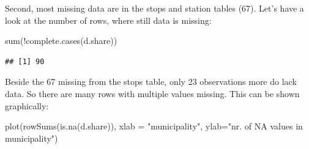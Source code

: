 \documentclass[
]{article}
\newenvironment{Shaded}{\begin{snugshade}}{\end{snugshade}}
\newcommand{\AttributeTok}[1]{\textcolor[rgb]{0.77,0.63,0.00}{#1}}
\newcommand{\CommentTok}[1]{\textcolor[rgb]{0.56,0.35,0.01}{\textit{#1}}}
\newcommand{\ConstantTok}[1]{\textcolor[rgb]{0.00,0.00,0.00}{#1}}
\newcommand{\FunctionTok}[1]{\textcolor[rgb]{0.00,0.00,0.00}{#1}}
\newcommand{\NormalTok}[1]{#1}
\newcommand{\OtherTok}[1]{\textcolor[rgb]{0.56,0.35,0.01}{#1}}
\newcommand{\SpecialCharTok}[1]{\textcolor[rgb]{0.00,0.00,0.00}{#1}}
\newcommand{\StringTok}[1]{\textcolor[rgb]{0.31,0.60,0.02}{#1}}
\begin{document}
\begin{Shaded}
\end{Shaded}

Second, most missing data are in the stops and station tables (67).
Let's have a look at the number of rows, where still data is missing:

\begin{Shaded}
\begin{Highlighting}[]
\FunctionTok{sum}\NormalTok{(}\SpecialCharTok{!}\FunctionTok{complete.cases}\NormalTok{(d.share))}
\end{Highlighting}
\end{Shaded}

\begin{verbatim}
## [1] 90
\end{verbatim}

Beside the 67 missing from the stops table, only 23 observations more do
lack data. So there are many rows with multiple values missing. This can
be shown graphically:

\begin{Shaded}
\begin{Highlighting}[]
\FunctionTok{plot}\NormalTok{(}\FunctionTok{rowSums}\NormalTok{(}\FunctionTok{is.na}\NormalTok{(d.share)), }\AttributeTok{xlab =} \StringTok{"municipality"}\NormalTok{, }\AttributeTok{ylab=}\StringTok{"nr. of NA values in municipality"}\NormalTok{)}
\end{Highlighting}
\end{Shaded}
\end{document}
